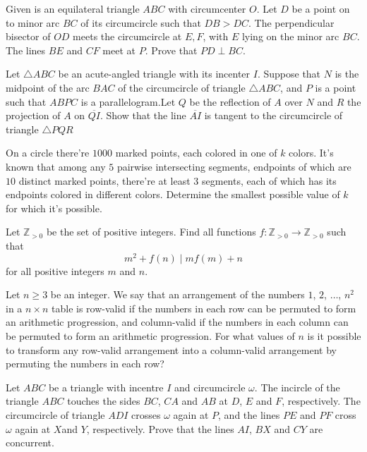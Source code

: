 \documentclass[11pt]{scrartcl}
\begin{document}
\begin{problem}[255403454348745096]
	Given is an equilateral triangle $ABC$ with circumcenter $O$. Let $D$ be a point on to minor arc $BC$ of its circumcircle such that $DB>DC$. The perpendicular bisector of $OD$ meets the circumcircle at $E, F$, with $E$ lying on the minor arc $BC$. The lines $BE$ and $CF$ meet at $P$. Prove that $PD \perp BC$.
\end{problem}
\begin{problem}[853206838493072]
Let $\triangle ABC$ be an acute-angled triangle with its incenter $I$. Suppose that $N$ is the midpoint of the arc $BAC$ of the circumcircle of triangle $\triangle ABC$, and $P$ is a point such that $ABPC$ is a parallelogram.Let $Q$ be the reflection of $A$ over $N$ and $R$ the projection of $A$ on $\overline{QI}$. Show that the line $\overline{AI}$ is tangent to the circumcircle of triangle $\triangle PQR$
\end{problem}
\begin{problem}[4738483219849723703]
On a circle there're $1000$ marked points, each colored in one of $k$ colors. It's known that among any $5$ pairwise intersecting segments, endpoints of which are $10$ distinct marked points, there're at least $3$ segments, each of which has its endpoints colored in different colors. Determine the smallest possible value of $k$ for which it's possible.
\end{problem}
\begin{problem}[168250003841029]
	Let $\mathbb{Z} _{>0}$ be the set of positive integers. Find all functions $f: \mathbb{Z} _{>0}\rightarrow \mathbb{Z} _{>0}$ such that
\[ m^2 + f(n) \mid mf(m) +n \]
for all positive integers $m$ and $n$.
\end{problem}
\begin{problem}[274933009357884]
Let $n\geq3$ be an integer. We say that an arrangement of the numbers $1$, $2$, $\dots$, $n^2$ in a $n \times n$ table is row-valid if the numbers in each row can be permuted to form an arithmetic progression, and column-valid if the numbers in each column can be permuted to form an arithmetic progression. For what values of $n$ is it possible to transform any row-valid arrangement into a column-valid arrangement by permuting the numbers in each row?
\end{problem}
\begin{problem}[7553717274310387624]
Let $ABC$ be a triangle with incentre $I$ and circumcircle $\omega$. The incircle of the triangle $ABC$
touches the sides $BC$, $CA$ and $AB$ at $D$, $E$ and $F$, respectively. The circumcircle of triangle $ADI$ crosses $\omega$ again at $P$, and the lines $PE$ and $PF$ cross $\omega$ again at $X$and $Y$, respectively. Prove that the lines $AI$, $BX$ and $CY$ are concurrent.
\end{problem}
\end{document}

